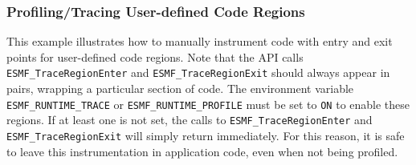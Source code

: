  
\setlength{\oldparskip}{\parskip}
\setlength{\parskip}{1.5ex}
\setlength{\oldparindent}{\parindent}
\setlength{\parindent}{0pt}
\setlength{\oldbaselineskip}{\baselineskip}
\setlength{\baselineskip}{11pt}
 
\def\bv{\begin{verbatim}}
\def\ev{\end{verbatim}}
\def\be{\begin{equation}}
\def\ee{\end{equation}}
\def\bea{\begin{eqnarray}}
\def\eea{\end{eqnarray}}
\def\bi{\begin{itemize}}
\def\ei{\end{itemize}}
\def\bn{\begin{enumerate}}
\def\en{\end{enumerate}}
\def\bd{\begin{description}}
\def\ed{\end{description}}
\def\({\left (}
\def\){\right )}
\def\[{\left [}
\def\]{\right ]}
\def\<{\left  \langle}
\def\>{\right \rangle}
\def\cI{{\cal I}}
\def\diag{\mathop{\rm diag}}
\def\tr{\mathop{\rm tr}}


 

   \subsubsection{Profiling/Tracing User-defined Code Regions} \label{ex:TraceUserEx}
  
   This example illustrates how to manually instrument code with
   entry and exit points for user-defined code regions. Note that the
   API calls {\tt ESMF\_TraceRegionEnter} and {\tt ESMF\_TraceRegionExit}
   should always appear in pairs, wrapping a particular section
   of code. The environment variable {\tt ESMF\_RUNTIME\_TRACE} 
   or {\tt ESMF\_RUNTIME\_PROFILE} must  
   be set to {\tt ON} to enable these regions. If at least one is not set, the calls to
   {\tt ESMF\_TraceRegionEnter} and {\tt ESMF\_TraceRegionExit}
   will simply return immediately. For this reason, it is safe to
   leave this instrumentation in application code, even when not being profiled.   

